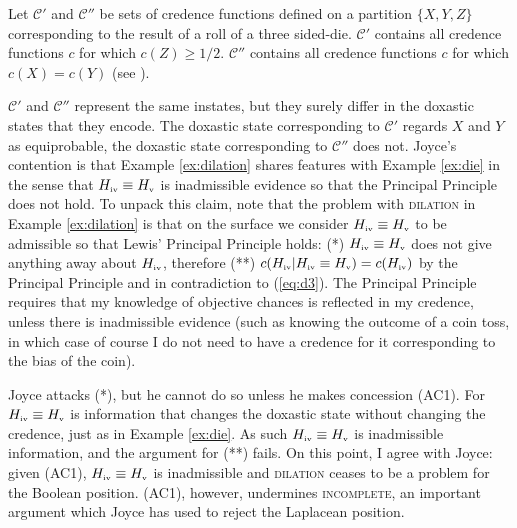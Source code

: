 \documentclass[11pt]{article}
\begin{document}
\begin{quotex}
  \label{ex:die} Let $\mathcal{C}'$ and
  $\mathcal{C}''$ be sets of credence functions defined on a partition
  $\{X,Y,Z\}$ corresponding to the result of a roll of a three
  sided-die. $\mathcal{C}'$ contains all credence functions $c$ for
  which $c(Z)\geq{}1/2$. $\mathcal{C}''$ contains all credence
  functions $c$ for which $c(X)=c(Y)$ (see ).
\end{quotex}

$\mathcal{C}'$ and $\mathcal{C}''$ represent the same instates, but
they surely differ in the doxastic states that they encode. The
doxastic state corresponding to $\mathcal{C}'$ regards $X$ and $Y$ as
equiprobable, the doxastic state corresponding to $\mathcal{C}''$ does
not. Joyce's contention is that Example \ref{ex:dilation} shares
features with Example \ref{ex:die} in the sense that
$H_{\mbox{\tiny{iv}}}\equiv{}H_{\mbox{\tiny{v}}}$ is inadmissible
evidence so that the Principal Principle does not hold. To unpack this
claim, note that the problem with \textsc{dilation} in Example
\ref{ex:dilation} is that on the surface we consider
$H_{\mbox{\tiny{iv}}}\equiv{}H_{\mbox{\tiny{v}}}$ to be admissible so
that Lewis' Principal Principle holds: (*)
$H_{\mbox{\tiny{iv}}}\equiv{}H_{\mbox{\tiny{v}}}$ does not give
anything away about $H_{\mbox{\tiny{iv}}}$, therefore (**)
$c(H_{\mbox{\tiny{iv}}}|H_{\mbox{\tiny{iv}}}\equiv{}H_{\mbox{\tiny{v}}})=c(H_{\mbox{\tiny{iv}}})$
by the Principal Principle and in contradiction to (\ref{eq:d3}). The
Principal Principle requires that my knowledge of objective chances is
reflected in my credence, unless there is inadmissible evidence (such
as knowing the outcome of a coin toss, in which case of course I do
not need to have a credence for it corresponding to the bias of the
coin).

Joyce attacks (*), but he cannot do so unless he makes concession
(AC1). For $H_{\mbox{\tiny{iv}}}\equiv{}H_{\mbox{\tiny{v}}}$ is
information that changes the doxastic state without changing the
credence, just as in Example \ref{ex:die}. As such
$H_{\mbox{\tiny{iv}}}\equiv{}H_{\mbox{\tiny{v}}}$ is inadmissible
information, and the argument for (**) fails. On this point,
I agree with Joyce: given (AC1),
$H_{\mbox{\tiny{iv}}}\equiv{}H_{\mbox{\tiny{v}}}$ is inadmissible and
\textsc{dilation} ceases to be a problem for the Boolean position.
(AC1), however, undermines \textsc{incomplete}, an important argument
which Joyce has used to reject the Laplacean position.
\end{document}
